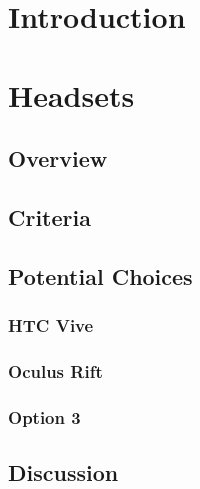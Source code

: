 \documentclass[letterpaper,10pt,onecolumn,compsoc]{IEEEtran}
\begin{document}
\newpage

\section{Introduction}

\noindent



\newpage

\iffalse
\fi

\section{Headsets}
\subsection{Overview}

\noindent



\subsection{Criteria}

\noindent


\subsection{Potential Choices}
\subsubsection{HTC Vive}

\noindent


\subsubsection{Oculus Rift}

\noindent


\subsubsection{Option 3}

\noindent


\subsection{Discussion}
\end{document}
